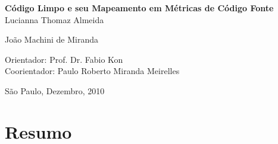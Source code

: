 \documentclass[11pt,a4paper]{book}
\begin{document}
\frontmatter 
\fancyhead[RO]{{\footnotesize\rightmark}\hspace{2em}\thepage}
\setcounter{tocdepth}{2}
\fancyhead[LE]{\thepage\hspace{2em}\footnotesize{\leftmark}}
\fancyhead[RE,LO]{}
\fancyhead[RO]{{\footnotesize\rightmark}\hspace{2em}\thepage}

\onehalfspacing  %

\thispagestyle{empty}
\begin{center}
    \vspace*{2.3cm}
    \textbf{\Large{Código Limpo e seu Mapeamento em Métricas de Código Fonte}}\\
    
    \vspace*{1.2cm}
    \Large{Lucianna Thomaz Almeida}

    \vspace*{0.5cm}
	\Large{João Machini de Miranda}
    
    
    \vskip 3.5cm
    Orientador: Prof. Dr. Fabio Kon\\
    Coorientador: Paulo Roberto Miranda Meirelles

    \vskip 1.5cm
    \normalsize{São Paulo, Dezembro, 2010}
\end{center}



\chapter*{Resumo}

%

%
\end{document}
